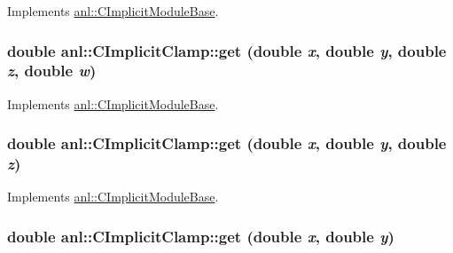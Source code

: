 Implements \hyperlink{classanl_1_1CImplicitModuleBase_aa40b7d54572197612a4fea44b63447eb}{anl::CImplicitModuleBase}.\hypertarget{classanl_1_1CImplicitClamp_a2ccd309fe3a92eb4e5aaa9f5921b6be3}{
\subsubsection[{get}]{\setlength{\rightskip}{0pt plus 5cm}double anl::CImplicitClamp::get (double {\em x}, \/  double {\em y}, \/  double {\em z}, \/  double {\em w})}}
\label{classanl_1_1CImplicitClamp_a2ccd309fe3a92eb4e5aaa9f5921b6be3}


Implements \hyperlink{classanl_1_1CImplicitModuleBase_a3cf520bdab59631864253c03b4e1723f}{anl::CImplicitModuleBase}.\hypertarget{classanl_1_1CImplicitClamp_ac35e4acee06cf5ad4ab4db236bcf8672}{
\subsubsection[{get}]{\setlength{\rightskip}{0pt plus 5cm}double anl::CImplicitClamp::get (double {\em x}, \/  double {\em y}, \/  double {\em z})}}
\label{classanl_1_1CImplicitClamp_ac35e4acee06cf5ad4ab4db236bcf8672}


Implements \hyperlink{classanl_1_1CImplicitModuleBase_ac17d592612c82ba3d47f9229a00b1fe3}{anl::CImplicitModuleBase}.\hypertarget{classanl_1_1CImplicitClamp_a2729b466be78da8a56b90eee7c3a2436}{
\subsubsection[{get}]{\setlength{\rightskip}{0pt plus 5cm}double anl::CImplicitClamp::get (double {\em x}, \/  double {\em y})}}
\label{classanl_1_1CImplicitClamp_a2729b466be78da8a56b90eee7c3a2436}


